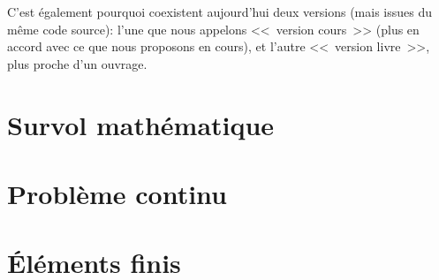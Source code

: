 \documentclass[11pt,pdflatex]{book}
\begin{document}
C'est également pourquoi coexistent aujourd'hui deux versions (mais issues du même code source):
l'une que nous appelons <<~version cours~>> (plus en accord avec ce que nous proposons en cours),
et l'autre <<~version livre~>>, plus proche d'un ouvrage.

%
%


\tableofcontents%


%
%



\part{Survol mathématique}







\part{Problème continu}



\ifVersionAvecExemplesSepares\else
\fi

\part{Éléments finis}













\end{document}

